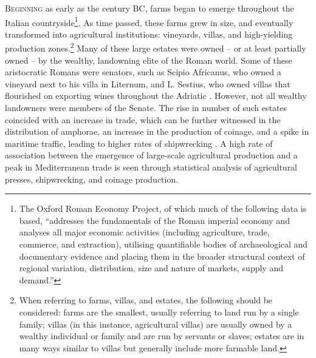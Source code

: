 		
	

	\lettrine[nindent=0em,lines=3]{B}{eginning} as early as the  century BC, 
farms began to emerge throughout the Italian countryside\footnote{The Oxford Roman Economy Project, of which much of the following data is based, “addresses the fundamentals of the Roman imperial economy and analyses all major economic activities (including agriculture, trade, commerce, and extraction), utilising quantifiable bodies of archaeological and documentary evidence and placing them in the broader structural context of regional variation, distribution, size and nature of markets, supply and demand.”}. 
As time passed, these farms grew in size, and eventually transformed into agricultural institutions: vineyards, villas, and high-yielding production zones.\footnote{When referring to farms, villas, and estates, the following should be considered: farms are the smallest, usually referring to land run by a single family; villas (in this instance, agricultural villas) are usually owned by a wealthy individual or family and are run by servants or slaves; estates are in many ways similar to villas but generally include more farmable land.} 
Many of these large estates were owned -- or at least partially owned -- by the wealthy, landowning elite of the Roman world. Some of these aristocratic Romans were senators, such as Scipio Africanus, who owned a vineyard next to his villa in Liternum, and L. Sestius, who owned villas that flourished on exporting wines throughout the Adriatic \parencite[6, 16]{Purcell_1985}. However, not all wealthy landowners were members of the Senate. The rise in number of such estates coincided with an increase in trade, which can be further witnessed in the distribution of amphorae, an increase in the production of coinage, and a spike in maritime traffic, leading to higher rates of shipwrecking \parencites{Manacorda_1978}{Hopkins_1980}. A high rate of association between the emergence of large-scale agricultural production and a peak in Mediterranean trade is seen through statistical analysis of agricultural presses, shipwrecking, and coinage production. 
	
